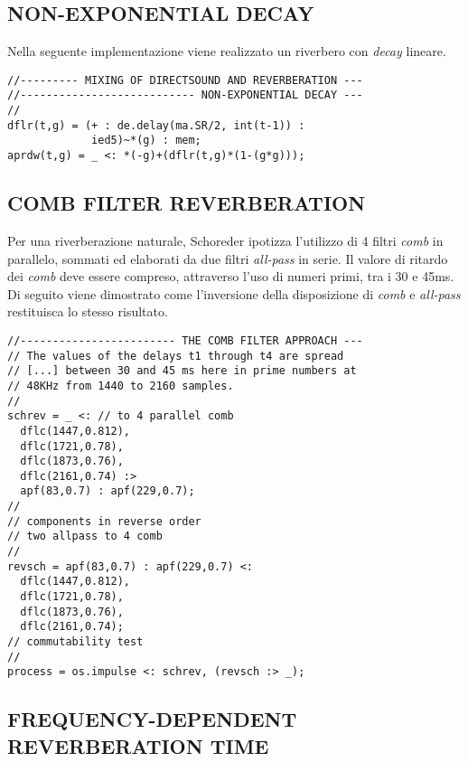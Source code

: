 \subsection*{NON-EXPONENTIAL DECAY}

Nella seguente implementazione viene realizzato un riverbero con \textit{decay}
lineare.

\begin{lstlisting}
//--------- MIXING OF DIRECTSOUND AND REVERBERATION ---
//--------------------------- NON-EXPONENTIAL DECAY ---
//
dflr(t,g) = (+ : de.delay(ma.SR/2, int(t-1)) :
             ied5)~*(g) : mem;
aprdw(t,g) = _ <: *(-g)+(dflr(t,g)*(1-(g*g)));
\end{lstlisting}

\subsection*{COMB FILTER REVERBERATION}

Per una riverberazione naturale, Schoreder ipotizza l'utilizzo di 4 filtri
\emph{comb} in parallelo, sommati ed elaborati da due filtri \emph{all-pass} in
serie. Il valore di ritardo dei \emph{comb} deve essere compreso, attraverso
l'uso di numeri primi, tra i 30 e 45ms. Di seguito viene dimostrato come
l'inversione della disposizione di \emph{comb} e \emph{all-pass} restituisca lo
stesso risultato.

\begin{lstlisting}
//------------------------ THE COMB FILTER APPROACH ---
// The values of the delays t1 through t4 are spread
// [...] between 30 and 45 ms here in prime numbers at
// 48KHz from 1440 to 2160 samples.
//
schrev = _ <: // to 4 parallel comb
  dflc(1447,0.812),
  dflc(1721,0.78),
  dflc(1873,0.76),
  dflc(2161,0.74) :>
  apf(83,0.7) : apf(229,0.7);
//
// components in reverse order
// two allpass to 4 comb
//
revsch = apf(83,0.7) : apf(229,0.7) <:
  dflc(1447,0.812),
  dflc(1721,0.78),
  dflc(1873,0.76),
  dflc(2161,0.74);
// commutability test
//
process = os.impulse <: schrev, (revsch :> _);
\end{lstlisting}

\subsection*{FREQUENCY-DEPENDENT REVERBERATION TIME}

